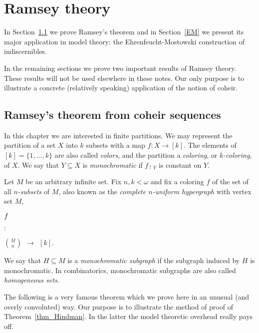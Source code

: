 \chapter{Ramsey theory}
\label{ramsey}

In Section~\ref{Ramsey} we prove Ramsey's theorem and in Section~\ref{EM} we present its major application in model theory: 
the Ehrenfeucht-Mostowski construction of indiscernibles.

In the remaining sections we prove two important results of Ramsey theory.
These results will not be used elsewhere in these notes.
Our only purpose is to illustrate a concrete (relatively speaking) application of the notion of coheir.

\def\medrel#1{\parbox[t]{6ex}{$\displaystyle\hfil #1$}}
\def\ceq#1#2#3{\parbox[t]{12ex}{$\displaystyle #1$}\medrel{#2}{$\displaystyle #3$}}



\section{Ramsey's theorem from coheir sequences}
\label{Ramsey}

In this chapter we are interested in finite partitions.
We may represent the partition of a set $X$ into $k$ subsets with a map $f:X\to [k]$.
The elements of $[k]=\{1,\dots,k\}$ are also called \emph{colors},
and the partition a \emph{coloring},
or \emph{$k$-coloring}, of $X$.
We say that $Y\subseteq X$ is \emph{monochromatic\/} if $f_{\restriction Y}$ is constant on $Y$.

Let $M$ be an arbitrary infinite set.
Fix $n,k<\omega$ and fix a coloring $f$ of the set of all \emph{$n$-subsets} of $M$,
also known as the \emph{complete $n$-uniform hypergraph\/} with vertex set $M$,

\ceq{\hfill f}{:}{ \binom{M}{n}\ \ \to\ \ [k]}.

We say that $H\subseteq M$ is a \emph{monochromatic subgraph\/} if the subgraph induced by $H$ is monochromatic.
In combinatorics, monochromatic subgraphs are also called \emph{homogeneous sets.}

The following is a very famous theorem which we prove here in an unusual (and overly convoluted)  way.
Our purpose is to illustrate the method of proof of Theorem~\ref{thm_Hindman}.
In the latter the model theoretic overhead really pays off.


